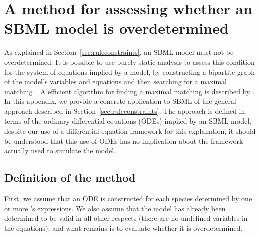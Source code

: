 
\section{A method for assessing whether an SBML model is overdetermined}
\label{apdx:assessing-overdetermined}

As explained in Section~\ref{sec:ruleconstraints}, an SBML model
must not be overdetermined.  It is possible to use purely static
analysis to assess this condition for the system of equations implied by a
model, by constructing a bipartite graph of the model's variables
and equations and then searching for a maximal
matching~\citep{chartrand_1977}.  A efficient algorithm for finding
a maximal matching is described by \cite{hopcroft:1973}.  In this
appendix, we provide a concrete application to SBML of the general
approach described in Section~\ref{sec:ruleconstraints}.  The
approach is defined in terms of the ordinary differential
equations (ODEs) implied by an SBML model; 
despite our use of a differential equation framework for
  this explanation, it should be understood that this
use of ODEs has no implication about the framework
  actually used to simulate the model.


\subsection*{Definition of the method}
\label{sec:overdetermined-method}

First, we assume that an ODE is constructed for each species
determined by one or more \Reaction's \KineticLaw {}
expressions.  We also assume that the model has already been
determined to be valid in all other respects (\eg there are no
undefined variables in the equations), and what remains is to
evaluate whether it is overdetermined.

